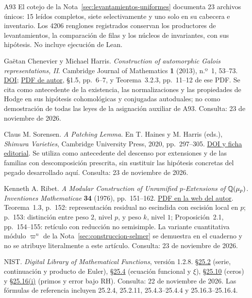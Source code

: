 \begin{thebibliography}{A93}
El cotejo de la Nota~\ref{sec:levantamientos-uniformes} documenta
23 archivos únicos: 15 leídos completos, siete selectivamente
y uno solo en su cabecera e inventario. Los 4206 renglones
registrados conservan los productores de levantamientos,
la comparación de filas y los núcleos de invariantes, con
sus hipótesis. No incluye ejecución de Lean.

Gaëtan Chenevier y Michael Harris.
\emph{Construction of automorphic Galois representations, II}.
Cambridge Journal of Mathematics \textbf{1} (2013), n.º~1, 53--73.
\href{https://doi.org/10.4310/CJM.2013.v1.n1.a2}{DOI};
\href{https://webusers.imj-prg.fr/~michael.harris/ConstructionII.pdf}{PDF de autor},
§1.5, pp.~6--7, y Teorema~3.2.3, pp.~11--12 de ese PDF.
Se cita como antecedente de la existencia, las normalizaciones y
las propiedades de Hodge en sus hipótesis cohomológicas y
conjugadas autoduales; no como demostración de todas las leyes
de la asignación auxiliar de A93. Consulta: 23 de noviembre de 2026.

Claus M. Sorensen. \emph{A Patching Lemma}.
En T. Haines y M. Harris (eds.), \emph{Shimura Varieties},
Cambridge University Press, 2020, pp.~297--305.
\href{https://doi.org/10.1017/9781108649711.012}{DOI y ficha editorial}.
Se utiliza como antecedente del descenso por extensiones
y de las familias con descomposición prescrita, sin sustituir
las hipótesis concretas del pegado desarrollado aquí.
Consulta: 23 de noviembre de 2026.

Kenneth A. Ribet.
\emph{A Modular Construction of Unramified $p$-Extensions of
$\mathbb{Q}(\mu_p)$}. \emph{Inventiones Mathematicae} \textbf{34}
(1976), pp.~151--162.
\href{https://math.berkeley.edu/~ribet/Articles/invent_34.pdf}{PDF en la web del autor}.
Teorema~1.3, p.~152: representación residual no escindida con
escisión local en $p$; p.~153: distinción entre peso $2$, nivel $p$,
y peso $k$, nivel $1$; Proposición~2.1, pp.~154--155:
retículo con reducción no semisimple. La variante cuantitativa
módulo $\varpi^n$ de la Nota~\ref{sec:construccion-selmer}
se demuestra en el cuaderno y no se atribuye literalmente a este
artículo. Consulta: 23 de noviembre de 2026.

NIST. \emph{Digital Library of Mathematical Functions}, versión 1.2.8.
\href{https://dlmf.nist.gov/25.2}{§25.2} (serie, continuación y producto de Euler),
\href{https://dlmf.nist.gov/25.4}{§25.4} (ecuación funcional y $\xi$),
\href{https://dlmf.nist.gov/25.10}{§25.10} (ceros) y
\href{https://dlmf.nist.gov/25.16}{§25.16(i)} (primos y error bajo RH).
Consulta: 22 de noviembre de 2026. Las fórmulas de referencia incluyen
25.2.4, 25.2.11, 25.4.3--25.4.4 y 25.16.3--25.16.4.


\end{thebibliography}
